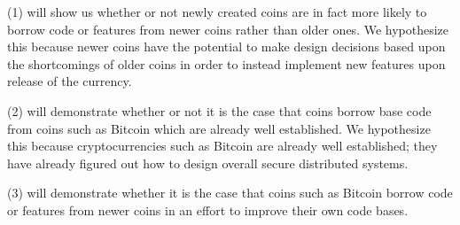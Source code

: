 

(1) will show us whether or not newly created coins are in fact more likely to borrow code or features from newer coins rather than older ones. We hypothesize this because newer coins have the potential to make design decisions based upon the shortcomings of older coins in order to instead implement new features upon release of the currency.  

(2) will demonstrate whether or not it is the case that coins borrow base code from coins such as Bitcoin which are already well established. We hypothesize this because cryptocurrencies such as Bitcoin are already well established; they have already figured out how to design overall secure distributed systems.

(3) will demonstrate whether it is the case that coins such as Bitcoin borrow code or features from newer coins in an effort to improve their own code bases.